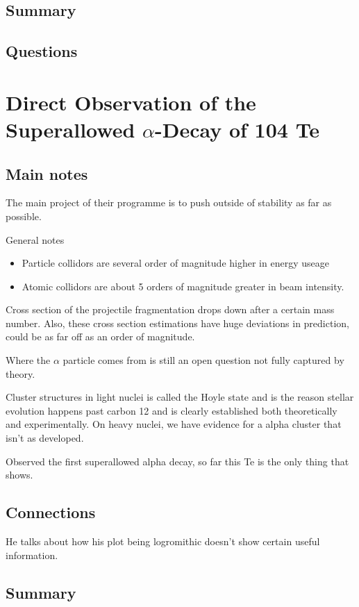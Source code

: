\subsection{Summary}


\subsection{Questions}



\section{Direct Observation of the Superallowed $\alpha$-Decay of 104 Te}
\subsection{Main notes}
The main project of their programme is to push outside of stability as far as possible.

General notes
\begin{itemize}
	\item Particle collidors are several order of magnitude higher in energy useage
  \item Atomic collidors are about 5 orders of magnitude greater in beam intensity.
\end{itemize}
Cross section of the projectile fragmentation drops down after a certain mass number. Also, these cross section estimations have huge deviations in prediction, could be as far off as an order of magnitude.

Where the $\alpha$ particle comes from is still an open question not fully captured by theory.

Cluster structures in light nuclei is called the Hoyle state and is the reason stellar evolution happens past carbon 12 and is clearly established both theoretically and experimentally. On heavy nuclei, we have evidence for a alpha cluster that isn't as developed.

Observed the first superallowed alpha decay, so far this Te is the only thing that shows.
\subsection{Connections}
He talks about how his plot being logromithic doesn't show certain useful information.

\subsection{Summary}


